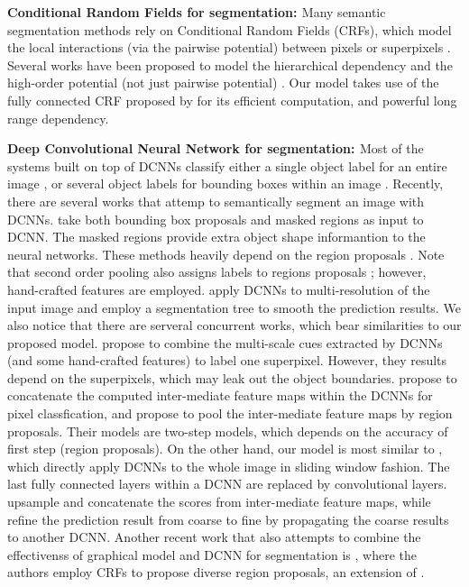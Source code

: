 {\bf{Conditional Random Fields for segmentation: }} Many semantic segmentation methods rely on Conditional Random Fields (CRFs), which model the local interactions (via the pairwise potential) between pixels \citep{rother2004grabcut, shotton2009textonboost} or superpixels \citep{lucchi2011spatial}. Several works have been proposed to model the hierarchical dependency \citep{he2004multiscale, ladicky2009associative, lempitsky2011pylon} and the high-order potential (not just pairwise potential) \citep{delong2012fast, gonfaus2010harmony, kohli2009robust, krahenbuhl2011efficient}. Our model takes use of the fully connected CRF proposed by \citet{krahenbuhl2011efficient} for its efficient computation, and powerful long range dependency.

{\bf{Deep Convolutional Neural Network for segmentation: }} Most of the systems built on top of DCNNs classify either a single object label for an entire image \citep{KrizhevskyNIPS2013, simonyan2014very, szegedy2014going}, or several object labels for bounding boxes within an image \citep{papandreou2014untangling, girshick2014rcnn}. Recently, there are several works that attemp to semantically segment an image with DCNNs. \citet{girshick2014rcnn, hariharan2014simultaneous} take both bounding box proposals and masked regions as input to DCNN. The masked regions provide extra object shape informantion to the neural networks. These methods heavily depend on the region proposals \citep{arbelaez2014multiscale, Uijlings13}. Note that second order pooling \citep{carreira2012semantic} also assigns labels to regions proposals \citep{carreira2012cpmc}; however, hand-crafted features are employed. \citet{farabet2013learning} apply DCNNs to multi-resolution of the input image and employ a segmentation tree to smooth the prediction results. We also notice that there are serveral concurrent works, which bear similarities to our proposed model. \citet{mostajabi2014feedforward} propose to combine the multi-scale cues extracted by DCNNs (and some hand-crafted features) to label one superpixel. However, they results depend on the superpixels, which may leak out the object boundaries. \citet{hariharan2014hypercolumns} propose to concatenate the computed inter-mediate feature maps within the DCNNs for pixel classfication, and \citet{dai2014convolutional} propose to pool the inter-mediate feature maps by region proposals. Their models are two-step models, which depends on the accuracy of first step (\ie region proposals). On the other hand, our model is most similar to \citet{long2014fully, eigen2014predicting}, which directly apply DCNNs to the whole image in sliding window fashion. The last fully connected layers within a DCNN are replaced by convolutional layers. \citet{long2014fully} upsample and concatenate the scores from inter-mediate feature maps, while \citet{eigen2014predicting} refine the prediction result from coarse to fine by propagating the coarse results to another DCNN. Another recent work that also attempts to combine the effectivenss of graphical model and DCNN for segmentation is \citet{cogswell2014combining}, where the authors employ CRFs to propose diverse region proposals, an extension of \citet{yadollahpour2013discriminative}.



